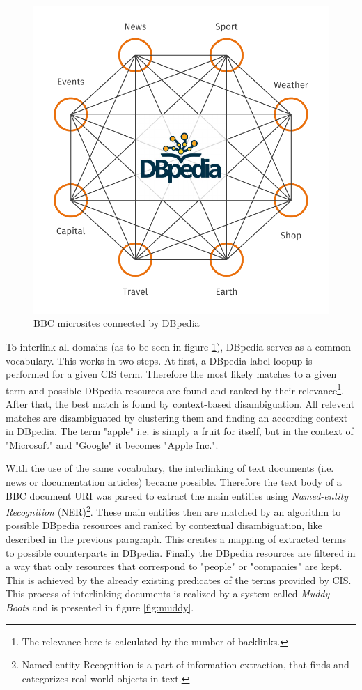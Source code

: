 \documentclass{llncs}
\begin{document}
\begin{figure}[!h]
  \centering
  \includegraphics[width=.75\textwidth]{images/dbpedia_dark}
  \caption{BBC microsites connected by DBpedia}
  \label{fig:dbpedia}
\end{figure}

To interlink all domains (as to be seen in figure \ref{fig:dbpedia}), DBpedia serves as a common vocabulary. This works in two steps. At first, a DBpedia label loopup is performed for a given CIS term. Therefore the most likely matches to a given term and possible DBpedia resources are found and ranked by their relevance\footnote{The relevance here is calculated by the number of backlinks.}. After that, the best match is found by context-based disambiguation. All relevent matches are disambiguated by clustering them and finding an according context in DBpedia. The term "apple" i.e. is simply a fruit for itself, but in the context of "Microsoft" and "Google" it becomes "Apple Inc.".

With the use of the same vocabulary, the interlinking of text documents (i.e. news or documentation articles) became possible. Therefore the text body of a BBC document URI was parsed to extract the main entities using \textit{Named-entity Recognition} (NER)\footnote{Named-entity Recognition is a part of information extraction, that finds and categorizes real-world objects in text.}. These main entities then are matched by an algorithm to possible DBpedia resources and ranked by contextual disambiguation, like described in the previous paragraph. This creates a mapping of extracted terms to possible counterparts in DBpedia. Finally the DBpedia resources are filtered in a way that only resources that correspond to "people" or "companies" are kept. This is achieved by the already existing predicates of the terms provided by CIS. This process of interlinking documents is realized by a system called \textit{Muddy Boots} and is presented in figure \ref{fig:muddy}.
\end{document}
